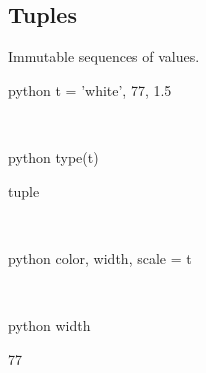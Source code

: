 \documentclass[aspectratio=1610,slidestop]{beamer}
\begin{document}
\subsection{Tuples}
\begin{pframe}
Immutable sequences of values.
 \begin{ipython}
  \begin{pythonin}{python}
t = 'white', 77, 1.5
  \end{pythonin}
  \\
  \begin{pythonin}{python}
type(t)
  \end{pythonin}
  \begin{pythonout}
tuple
  \end{pythonout}
 \\

 \begin{pythonin}{python}
color, width, scale = t
  \end{pythonin}
  \\
  \begin{pythonin}{python}
width
  \end{pythonin}
  \begin{pythonout}
77
  \end{pythonout}
 \end{ipython}
\end{pframe}
\end{document}
